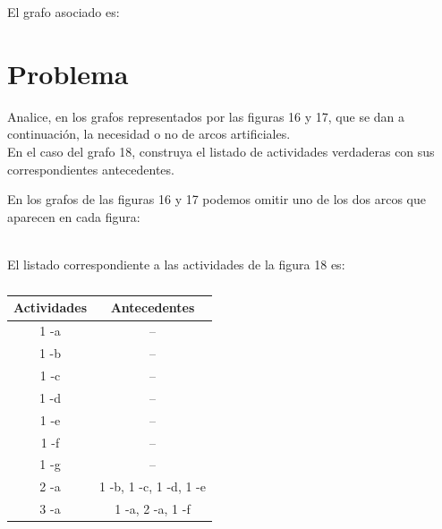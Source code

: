 \documentclass[autocontact]{gaceta}
\begin{document}
        El grafo asociado es:

        

\section{Problema}
        Analice, en los grafos representados por las figuras 16 y 17, que se dan a continuación, 
        la necesidad o no de arcos artificiales.\\
        En el caso del grafo 18, construya el listado de actividades verdaderas con sus correspondientes
        antecedentes.

        
        
        
        \pagebreak

        En los grafos de las figuras 16 y 17 podemos omitir uno de los dos arcos que aparecen en cada
        figura:
        
        \\
        
        El listado correspondiente a las actividades de la figura 18 es:

        \begin{table}[h]
            \begin{center}
            
                \begin{tabular}{|c|c|}
                    \hline
                    Actividades & Antecedentes \\
                    \hline
                    1 -a & -- \\
                    \hline
                    1 -b & -- \\
                    \hline
                    1 -c & -- \\
                    \hline
                    1 -d & -- \\
                    \hline
                    1 -e & -- \\
                    \hline
                    1 -f & -- \\
                    \hline 
                    1 -g & -- \\
                    \hline 
                    2 -a & 1 -b, 1 -c, 1 -d, 1 -e \\
                    \hline
                    3 -a & 1 -a, 2 -a, 1 -f                    \\
                    \hline                      
                
                \end{tabular}   
            
            \end{center}
            \caption{}
        \end{table}
\end{document}
